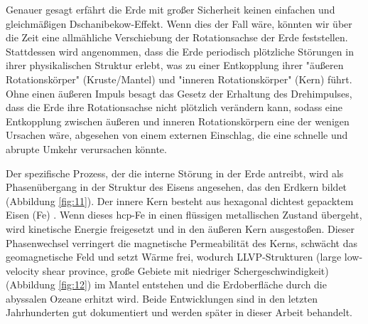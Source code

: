 \documentclass[10pt,twocolumn,letterpaper]{article}
\begin{document}
Genauer gesagt erfährt die Erde mit großer Sicherheit keinen einfachen und gleichmäßigen Dschanibekow-Effekt. Wenn dies der Fall wäre, könnten wir über die Zeit eine allmähliche Verschiebung der Rotationsachse der Erde feststellen. Stattdessen wird angenommen, dass die Erde periodisch plötzliche Störungen in ihrer physikalischen Struktur erlebt, was zu einer Entkopplung ihrer "äußeren Rotationskörper" (Kruste/Mantel) und "inneren Rotationskörper" (Kern) führt. Ohne einen äußeren Impuls besagt das Gesetz der Erhaltung des Drehimpulses, dass die Erde ihre Rotationsachse nicht plötzlich verändern kann, sodass eine Entkopplung zwischen äußeren und inneren Rotationskörpern eine der wenigen Ursachen wäre, abgesehen von einem externen Einschlag, die eine schnelle und abrupte Umkehr verursachen könnte.

Der spezifische Prozess, der die interne Störung in der Erde antreibt, wird als Phasenübergang in der Struktur des Eisens angesehen, das den Erdkern bildet (Abbildung \ref{fig:11}). Der innere Kern besteht aus hexagonal dichtest gepacktem Eisen (Fe) \cite{141}. Wenn dieses hcp-Fe in einen flüssigen metallischen Zustand übergeht, wird kinetische Energie freigesetzt und in den äußeren Kern ausgestoßen. Dieser Phasenwechsel verringert die magnetische Permeabilität des Kerns, schwächt das geomagnetische Feld und setzt Wärme frei, wodurch LLVP-Strukturen (large low-velocity shear province, große Gebiete mit niedriger Schergeschwindigkeit) (Abbildung \ref{fig:12}) \cite{38} im Mantel entstehen und die Erdoberfläche durch die abyssalen Ozeane erhitzt wird. Beide Entwicklungen sind in den letzten Jahrhunderten gut dokumentiert und werden später in dieser Arbeit behandelt.
\end{document}
